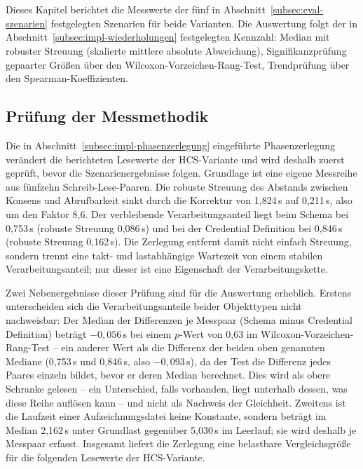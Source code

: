 \chapter{}
\label{cha:results}

Dieses Kapitel berichtet die Messwerte der fünf in Abschnitt~\ref{subsec:eval-szenarien} festgelegten Szenarien für beide Varianten. Die Auswertung folgt der in Abschnitt~\ref{subsec:impl-wiederholungen} festgelegten Kennzahl: Median mit robuster Streuung (skalierte mittlere absolute Abweichung), Signifikanzprüfung gepaarter Größen über den Wilcoxon-Vorzeichen-Rang-Test, Trendprüfung über den Spearman-Koeffizienten.

\section{Prüfung der Messmethodik}
\label{sec:results-methodik}

Die in Abschnitt~\ref{subsec:impl-phasenzerlegung} eingeführte Phasenzerlegung verändert die berichteten Lesewerte der HCS-Variante und wird deshalb zuerst geprüft, bevor die Szenarienergebnisse folgen. Grundlage ist eine eigene Messreihe aus fünfzehn Schreib-Lese-Paaren. Die robuste Streuung des Abstands zwischen Konsens und Abrufbarkeit sinkt durch die Korrektur von 1,824\,s auf 0,211\,s, also um den Faktor 8,6. Der verbleibende Verarbeitungsanteil liegt beim Schema bei 0,753\,s (robuste Streuung 0,086\,s) und bei der Credential Definition bei 0,846\,s (robuste Streuung 0,162\,s). Die Zerlegung entfernt damit nicht einfach Streuung, sondern trennt eine takt- und lastabhängige Wartezeit von einem stabilen Verarbeitungsanteil; nur dieser ist eine Eigenschaft der Verarbeitungskette.

Zwei Nebenergebnisse dieser Prüfung sind für die Auswertung erheblich. Erstens unterscheiden sich die Verarbeitungsanteile beider Objekttypen nicht nachweisbar: Der Median der Differenzen je Messpaar (Schema minus Credential Definition) beträgt $-0{,}056$\,s bei einem $p$-Wert von 0,63 im Wilcoxon-Vorzeichen-Rang-Test -- ein anderer Wert als die Differenz der beiden oben genannten Mediane (0,753\,s und 0,846\,s, also $-0{,}093$\,s), da der Test die Differenz jedes Paares einzeln bildet, bevor er deren Median berechnet. Dies wird als obere Schranke gelesen -- ein Unterschied, falls vorhanden, liegt unterhalb dessen, was diese Reihe auflösen kann -- und nicht als Nachweis der Gleichheit. Zweitens ist die Laufzeit einer Aufzeichnungsdatei keine Konstante, sondern beträgt im Median 2,162\,s unter Grundlast gegenüber 5,030\,s im Leerlauf; sie wird deshalb je Messpaar erfasst. Insgesamt liefert die Zerlegung eine belastbare Vergleichsgröße für die folgenden Lesewerte der HCS-Variante.

